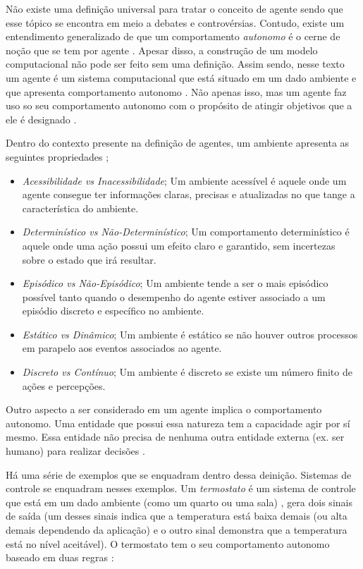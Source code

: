 Não existe uma definição universal para tratar o conceito de agente sendo que esse tópico se encontra em meio a debates e controvérsias. Contudo, existe um entendimento generalizado de que 
um comportamento \textit{autonomo} é o cerne de noção que se tem por agente \cite{whatisagent}.  Apesar disso, a construção de um modelo computacional não pode ser feito sem uma definição. Assim sendo, nesse texto um agente é
 um sistema computacional que está situado em um dado ambiente e que apresenta comportamento autonomo \cite{definitionagent} \cite{whatisagent}. Não apenas isso, mas um agente faz uso
 so seu comportamento autonomo com o propósito de atingir objetivos que a ele é designado \cite{definitionagent} \cite{whatisagent}.

Dentro do contexto presente na definição de agentes, um ambiente apresenta as seguintes propriedades \cite{artificialinteligencemodermapproach} \cite{whatisagent}; 
\begin{itemize}
    \item \textit{Acessibilidade vs Inacessibilidade}; Um ambiente acessível é aquele onde um agente consegue ter informações claras, precisas e atualizadas no que tange a característica do ambiente.
    \item \textit{Determinístico vs Não-Determinístico}; Um comportamento determinístico é aquele onde uma ação possui um efeito claro e garantido, sem incertezas sobre o estado que irá resultar.
    \item \textit{Episódico vs Não-Episódico}; Um ambiente tende a ser o mais episódico possível tanto quando o desempenho do agente estiver associado a um episódio discreto e específico no ambiente.
    \item \textit{Estático vs Dinâmico}; Um ambiente é estático se não houver outros processos em parapelo aos eventos associados ao agente.
    \item \textit{Discreto vs Contínuo}; Um ambiente é discreto se existe um número finito de ações e percepções. 
\end{itemize}

Outro aspecto a ser considerado em um agente implica o comportamento autonomo. Uma entidade que possui essa natureza tem a capacidade agir por sí mesmo. Essa entidade não precisa de nenhuma outra entidade externa 
(ex. ser humano) para realizar decisões \cite{whatisagent} \cite{definitionagent}.

Há uma série de exemplos que se enquadram dentro dessa deinição. Sistemas de controle se enquadram nesses exemplos. Um \textit{termostato} é um sistema de controle que está em um dado ambiente 
(como um quarto ou uma sala) \cite{whatisagent}, gera dois sinais de saída (um desses sinais indica que a temperatura está baixa demais (ou alta demais dependendo da aplicação) e o outro sinal
demonstra que a temperatura está no nível aceitável). O termostato tem o seu comportamento autonomo baseado em duas regras \cite{whatisagent}:

